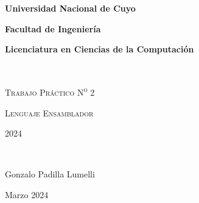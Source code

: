 {\centering
    {\bfseries\Large Universidad Nacional de Cuyo \par}
    \vspace{-0.2cm}
    {\bfseries\Large Facultad de Ingeniería \par}
    \vspace{-0.2cm}
    {\bfseries\Large Licenciatura en Ciencias de la Computación \par}
    \pagestyle{plain}
    \vfill
    \noindent\hrulefill \\
    {\scshape\Huge Trabajo Práctico N\textsuperscript{\Large o} 2\par} %
    \vspace{0.5cm}
    {\scshape\Large Lenguaje Ensamblador \par}
    {\scshape\large  \par}
    \vspace{0.5cm}
    {\scshape\Large 2024 \par} %
    \noindent\hrulefill \\
    \vspace{4cm}
    {\Large Gonzalo Padilla Lumelli \par}
    {\large Marzo 2024 \par} %
    \vfill
    \setcounter{page}{1}
    \newpage
}